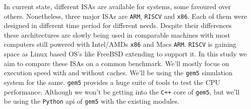 In current state, different ISAs are available for systems, some favoured over others. Nonetheless,
three major ISAs are \texttt{ARM}, \texttt{RISCV} and \texttt{x86}. Each of them were designed in different
time period for different needs. Despite their differences these architectures are slowly being used in 
comparable machines with most computers still powered with Intel/AMDs \texttt{x86} and Macs \texttt{ARM}.
\texttt{RISCV} is gaining space as Linux based OS's like FreeBSD extending to support it. In this study we
aim to compare these ISAs on a common benchmark. We'll mostly focus on execution speed with and without 
caches. We'll be using the \texttt{gem5} simulation system for the same. \texttt{gem5} provides a 
huge suite of tools to test the CPU performance. Although we won't be getting into the \texttt{C++} core
of \texttt{gem5}, but we'll be using the \texttt{Python} api of \texttt{gem5} with the existing modules. 